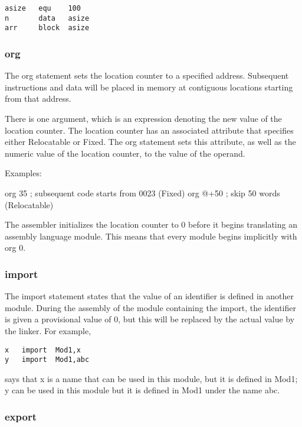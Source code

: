 \documentclass[11pt]{article}
\begin{document}
\begin{verbatim}
asize   equ    100
n       data   asize
arr     block  asize
\end{verbatim}

\subsubsection*{org}
\label{sec:org03849a1}

The org statement sets the location counter to a specified address.
Subsequent instructions and data will be placed in memory at
contiguous locations starting from that address.

There is one argument, which is an expression denoting the new value
of the location counter.  The location counter has an associated
attribute that specifies either Relocatable or Fixed.  The org
statement sets this attribute, as well as the numeric value of the
location counter, to the value of the operand.

Examples:

org   35     ; subsequent code starts from 0023 (Fixed)
org   @+50   ; skip 50 words (Relocatable)

The assembler initializes the location counter to 0 before it begins
translating an assembly language module.  This means that every module
begins implicitly with org 0.

\subsubsection*{import}
\label{sec:orgf49711f}

The import statement states that the value of an identifier is defined
in another module.  During the assembly of the module containing the
import, the identifier is given a provisional value of 0, but this
will be replaced by the actual value by the linker.  For example,

\begin{verbatim}
x   import  Mod1,x
y   import  Mod1,abc
\end{verbatim}

says that x is a name that can be used in this module, but it is
defined in Mod1; y can be used in this module but it is defined in
Mod1 under the name abc.

\subsubsection*{export}
\label{sec:org0ddb67d}
\end{document}
